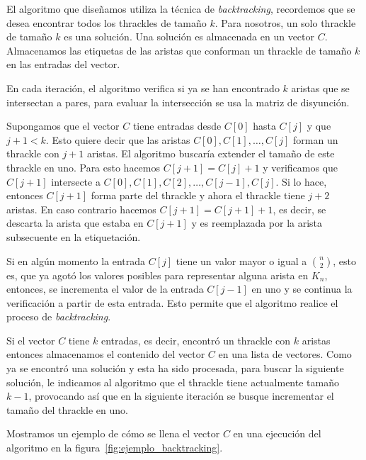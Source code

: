   El algoritmo que diseñamos utiliza la técnica de \emph{backtracking},
  recordemos que se desea encontrar todos los thrackles de tamaño $k$. Para
  nosotros, un solo thrackle de tamaño $k$ es una solución. Una solución es
  almacenada en un vector $C$. Almacenamos las etiquetas de las aristas que
  conforman un thrackle de tamaño $k$ en las entradas del vector.

  En cada iteración, el algoritmo verifica si ya se han encontrado $k$ aristas
  que se intersectan a pares, para evaluar la intersección se usa la matriz de
  disyunción.

  Supongamos que el vector $C$ tiene entradas desde $C[0]$ hasta $C[j]$ y que
  $j+1 < k$. Esto quiere decir que las aristas $C[0],C[1],\dots,C[j]$ forman un
  thrackle con $j+1$ aristas. El algoritmo buscaría extender el tamaño de este
  thrackle en uno. Para esto hacemos $C[j+1]=C[j]+1$ y verificamos que $C[j+1]$
  intersecte a $C[0],C[1],C[2],\dots,C[j-1],C[j]$. Si lo hace, entonces
  $C[j+1]$ forma parte del thrackle y ahora el thrackle tiene $j+2$ aristas. En
  caso contrario hacemos $C[j+1]=C[j+1]+1$, es decir, se descarta la arista que
  estaba en $C[j+1]$ y es reemplazada por la arista subsecuente en la
  etiquetación.

  Si en algún momento la entrada $C[j]$ tiene un valor mayor o igual a
  $\binom{n}{2}$, esto es, que ya agotó los valores posibles para representar
  alguna arista en $K_n$, entonces, se incrementa el valor de la entrada
  $C[j-1]$ en uno y se continua la verificación a partir de esta entrada. Esto
  permite que el algoritmo realice el proceso de \emph{backtracking}.

  Si el vector $C$ tiene $k$ entradas, es decir, encontró un thrackle con $k$
  aristas entonces almacenamos el contenido del vector $C$ en una lista de
  vectores. Como ya se encontró una solución y esta ha sido procesada, para
  buscar la siguiente solución, le indicamos al algoritmo que el thrackle tiene
  actualmente tamaño $k-1$, provocando así que en la siguiente iteración se
  busque incrementar el tamaño del thrackle en uno.

  Mostramos un ejemplo de cómo se llena el vector $C$ en una
  ejecución del algoritmo en la figura~\ref{fig:ejemplo_backtracking}.

